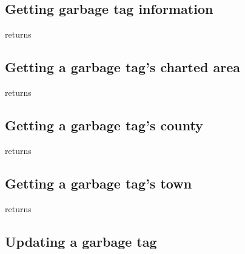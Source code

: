 \subsection{Getting garbage tag information}

\begin{apidata}{returns}
  \begin{datalist}
  \end{datalist}
\end{apidata}

\subsection{Getting a garbage tag's charted area}

\begin{apidata}{returns}
  \begin{datalist}
  \end{datalist}
\end{apidata}

\subsection{Getting a garbage tag's county}

\begin{apidata}{returns}
  \begin{datalist}
  \end{datalist}
\end{apidata}

\subsection{Getting a garbage tag's town}

\begin{apidata}{returns}
  \begin{datalist}
  \end{datalist}
\end{apidata}

\subsection{Updating a garbage tag}

